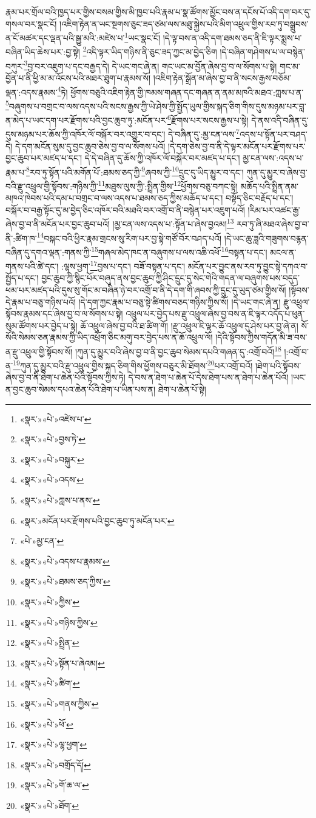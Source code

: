 རྣམ་པར་གྲོལ་བའི་ཁྱད་པར་གྱིས་བསམ་གྱིས་མི་ཁྱབ་པའི་རྣམ་པ་སྣ་ཚོགས་མྱོང་བས་ན་དངོས་པོ་འདི་དག་བར་དུ་གསལ་བར་སྣང་ངོ། །འཇིག་རྟེན་ན་ཡང་སྔགས་ཅུང་ཟད་ཙམ་ལས་མཐུ་སྐྱེས་པའི་མིག་འཕྲུལ་གྱིས་རབ་ཏུ་བསྒྲུབས་ན་ངོ་མཚར་དང་ལྡན་པའི་སྒྱུ་མའི་:མཛེས་པ་\footnote{«སྣར་»«པེ་»འཛེས་པ་}ཡང་སྣང་ངོ། །དེ་ལྟ་བས་ན་འདི་དག་ཐམས་ཅད་ནི་ཇི་ལྟར་སྨྲས་པ་བཞིན་ཡིད་ཆེས་པར་:བྱ་སྟེ། \footnote{«སྣར་»«པེ་»བྱས་ཏེ་}འདི་ལྟར་ཡིད་གཉིས་ནི་ཅུང་ཟད་ཀྱང་མ་བྱེད་ཅིག །དེ་བཞིན་གཤེགས་པ་ལ་བསྙེན་བཀུར་\footnote{«སྣར་»«པེ་»བསྐུར་}བྱ་བར་འཇུག་པ་དང་བརྒྱད་དེ། དེ་ཡང་གང་ཞེ་ན། གང་ཡང་མ་བྱོན་ཞེས་བྱ་བ་ལ་སོགས་པ་སྟེ། གང་མ་བྱོན་པ་ནི་ཕྱི་མ་མ་འོངས་པའི་མཐར་ཐུག་པ་རྣམས་སོ། །འཇིག་རྟེན་སྒྲོན་མ་ཞེས་བྱ་བ་ནི་སངས་རྒྱས་བཅོམ་ལྡན་:འདས་རྣམས་\footnote{«སྣར་»«པེ་»འདས་}ཏེ། ཕྱོགས་བཅུའི་འཇིག་རྟེན་གྱི་ཁམས་གཞན་དང་གཞན་ན་ནམ་མཁའི་མཐའ་:ཀླས་པ་ན་\footnote{«སྣར་»«པེ་»ཀླས་པ་ནས་}བཞུགས་པ་བགྲང་བ་ལས་འདས་པའི་སངས་རྒྱས་ཀྱི་ཡེ་ཤེས་ཀྱི་སྤྱོད་ཡུལ་གྱིས་སྐད་ཅིག་གིས་དུས་མཉམ་པར་བླ་ན་མེད་པ་ཡང་དག་པར་རྫོགས་པའི་བྱང་ཆུབ་ཏུ་:མངོན་པར་\footnote{«སྣར་»མངོན་པར་རྫོགས་པའི་བྱང་ཆུབ་ཏུ་མངོན་པར་}རྫོགས་པར་སངས་རྒྱས་པ་སྟེ། དེ་ནས་འདི་བཞིན་དུ་དུས་མཉམ་པར་ཆོས་ཀྱི་འཁོར་ལོ་བསྐོར་བར་འགྱུར་བ་དང་། དེ་བཞིན་དུ་:མྱ་ངན་ལས་\footnote{«པེ་»མྱ་ངན་}འདས་པ་སྟོན་པར་བཤད་དེ། དེ་དག་མངོན་སུམ་དུ་བྱང་ཆུབ་ཅེས་བྱ་བ་ལ་སོགས་པའོ། །དེ་དག་ཅེས་བྱ་བ་ནི་དེ་ལྟར་མངོན་པར་རྫོགས་པར་བྱང་ཆུབ་པར་མཛད་པ་དང་། དེ་དེ་བཞིན་དུ་ཆོས་ཀྱི་འཁོར་ལོ་བསྐོར་བར་མཛད་པ་དང་། མྱ་ངན་ལས་:འདས་པ་རྣམ་པ་\footnote{«སྣར་»«པེ་»འདས་པ་རྣམས་}རབ་ཏུ་སྟོན་པའི་མགོན་པོ་:ཐམས་ཅད་ཀྱི་\footnote{«སྣར་»«པེ་»ཐམས་ཅད་ཀྱིས་}ཞབས་ཀྱི་\footnote{«སྣར་»«པེ་»ཀྱིས་}དྲུང་དུ་ཡིད་མྱུར་བ་དང་། ཀུན་དུ་མྱུར་བ་ཞེས་བྱ་བའི་རྫུ་འཕྲུལ་གྱི་སྟོབས་:གཉིས་ཀྱི་\footnote{«སྣར་»«པེ་»གཉིས་ཀྱིས་}མཐུས་ལུས་ཀྱི་:སྤྲིན་གྱིས་\footnote{«སྣར་»«པེ་»སྤྲིན་}ཕྱོགས་བཅུ་བཀང་སྟེ། མཆོད་པའི་སྤྲིན་ནམ་མཁའ་ཁེབས་པའི་དམ་པ་བགྲང་བ་ལས་འདས་པ་ཐམས་ཅད་ཀྱིས་མཆོད་པ་དང་། བསྟོད་ཅིང་བརྗོད་པ་དང་། བསྐོར་བ་བརྒྱ་སྟོང་དུ་མ་བྱེད་ཅིང་འཁོར་བའི་མཐའི་བར་འགྲོ་བ་ནི་བསྙེན་པར་འཇུག་པའོ། །རིམ་པར་འཚང་རྒྱ་ཞེས་བྱ་བ་ནི་མངོན་པར་བྱང་ཆུབ་པའོ། །མྱ་ངན་ལས་འདས་པ་:སྟོན་པ་ཞེས་བྱའམ།\footnote{«སྣར་»«པེ་»སྟོན་པ་ཞེའམ།} རབ་ཏུ་ཞི་མཐའ་ཞེས་བྱ་བ་ནི་:ཚིག་ཁ་\footnote{«སྣར་»«པེ་»ཚིག་}བསྐང་བའི་ཕྱིར་རྣམ་གྲངས་སུ་རིག་པར་བྱ་སྟེ་གཙོ་བོར་བཤད་པའོ། །དེ་ཡང་ཆུ་ཟླའི་གཟུགས་བརྙན་བཞིན་དུ་དགའ་ལྡན་:གནས་ཀྱི་\footnote{«སྣར་»«པེ་»གནས་ཀྱིས་}གཞལ་མེད་ཁང་ན་བཞུགས་པ་ལས་འཆི་འཕོ་\footnote{«སྣར་»«པེ་»ཕོ་}བསྟན་པ་དང་། མངལ་ན་གནས་པའི་ཚེ་དང་། :ལྷས་ཕྱག་\footnote{«སྣར་»«པེ་»ལྷ་ཕྱག་}བྱས་པ་དང་། བཟོ་བསྟན་པ་དང་། མངོན་པར་བྱུང་ནས་རབ་ཏུ་བྱུང་སྟེ་དཀའ་བ་སྤྱོད་པ་དང་། བྱང་ཆུབ་ཀྱི་སྙིང་པོར་བཞུད་ནས་བྱང་ཆུབ་ཀྱི་ཤིང་དྲུང་དུ་སེང་གེའི་གདན་ལ་བཞུགས་པས་བདུད་ཕམ་པར་མཛད་པའི་དུས་སུ་གོང་མ་བཞིན་ཉེ་བར་འགྲོ་བ་ནི་དེ་དག་གི་ཞབས་ཀྱི་དྲུང་དུ་ཡུད་ཙམ་གྱིས་སོ། །སྟོབས་དེ་རྣམ་པ་བཅུ་གཉིས་པའོ། །དེ་དག་ཀྱང་རྣམ་པ་བཅུ་སྟེ་ཚིགས་བཅད་གཉིས་ཀྱིས་སོ། །དེ་ཡང་གང་ཞེ་ན། རྫུ་འཕྲུལ་སྟོབས་རྣམས་དང་ཞེས་བྱ་བ་ལ་སོགས་པ་སྟེ། འཕྲུལ་པར་བྱེད་པས་རྫུ་འཕྲུལ་ཞེས་བྱ་བས་ན་ཇི་ལྟར་འདོད་པ་ཕུན་སུམ་ཚོགས་པར་བྱེད་པ་སྟེ། ཆོ་འཕྲུལ་ཞེས་བྱ་བའི་ཐ་ཚིག་གོ། །རྫུ་འཕྲུལ་ཇི་ལྟར་ཆོ་འཕྲུལ་དུ་ཤེས་པར་བྱ་ཞེ་ན། སོ་སོའི་སེམས་ཅན་རྣམས་ཀྱི་ཡིད་འཕྲོག་ཅིང་མགུ་བར་བྱེད་པས་ན་ཆོ་འཕྲུལ་ལོ། །དེའི་སྟོབས་ཀྱིས་གདོན་མི་ཟ་བས་ན་རྫུ་འཕྲུལ་གྱི་སྟོབས་སོ། །ཀུན་དུ་མྱུར་བའི་ཞེས་བྱ་བ་ནི་བྱང་ཆུབ་སེམས་དཔའི་གཞན་དུ་:འགྲོ་བའོ།\footnote{«སྣར་»«པེ་»བགྲོད་དོ།} །:འགྲོ་བ་ན་\footnote{«སྣར་»«པེ་»གོ་ཆ་ལ་}ཀུན་དུ་མྱུར་བའི་རྫུ་འཕྲུལ་གྱིས་སྐད་ཅིག་གིས་ཕྱོགས་བཅུར་མི་ཐོགས་\footnote{«སྣར་»«པེ་»ཐོག་}པར་འགྲོ་བའོ། །ཐེག་པའི་སྟོབས་ཞེས་བྱ་བ་ནི་ཐེག་པ་ཆེན་པོའི་སྟོབས་ཀྱིས་ཏེ། དེ་བས་ན་ཐེག་པ་ཆེན་པོ་དེས་ཐེག་པས་ན་ཐེག་པ་ཆེན་པོའོ། །ཡང་ན་བྱང་ཆུབ་སེམས་དཔའ་ཆེན་པོའི་ཐེག་པ་ཡིན་པས་ན། ཐེག་པ་ཆེན་པོ་སྟེ། 